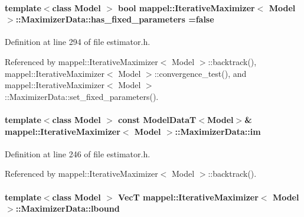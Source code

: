 \paragraph[{\texorpdfstring{has\+\_\+fixed\+\_\+parameters}{has_fixed_parameters}}]{\setlength{\rightskip}{0pt plus 5cm}template$<$class Model $>$ bool {\bf mappel\+::\+Iterative\+Maximizer}$<$ Model $>$\+::Maximizer\+Data\+::has\+\_\+fixed\+\_\+parameters =false}\hypertarget{classmappel_1_1IterativeMaximizer_1_1MaximizerData_a9f1c22b2c3065f92244230a74fc948aa}{}\label{classmappel_1_1IterativeMaximizer_1_1MaximizerData_a9f1c22b2c3065f92244230a74fc948aa}


Definition at line 294 of file estimator.\+h.



Referenced by mappel\+::\+Iterative\+Maximizer$<$ Model $>$\+::backtrack(), mappel\+::\+Iterative\+Maximizer$<$ Model $>$\+::convergence\+\_\+test(), and mappel\+::\+Iterative\+Maximizer$<$ Model $>$\+::\+Maximizer\+Data\+::set\+\_\+fixed\+\_\+parameters().

\paragraph[{\texorpdfstring{im}{im}}]{\setlength{\rightskip}{0pt plus 5cm}template$<$class Model $>$ const {\bf Model\+DataT}$<$Model$>$\& {\bf mappel\+::\+Iterative\+Maximizer}$<$ Model $>$\+::Maximizer\+Data\+::im}\hypertarget{classmappel_1_1IterativeMaximizer_1_1MaximizerData_afcee3fa283be1a9ba1d197ed777d447c}{}\label{classmappel_1_1IterativeMaximizer_1_1MaximizerData_afcee3fa283be1a9ba1d197ed777d447c}


Definition at line 246 of file estimator.\+h.



Referenced by mappel\+::\+Iterative\+Maximizer$<$ Model $>$\+::backtrack().

\paragraph[{\texorpdfstring{lbound}{lbound}}]{\setlength{\rightskip}{0pt plus 5cm}template$<$class Model $>$ {\bf VecT} {\bf mappel\+::\+Iterative\+Maximizer}$<$ Model $>$\+::Maximizer\+Data\+::lbound}\hypertarget{classmappel_1_1IterativeMaximizer_1_1MaximizerData_aead80fc0e12236ca355849ad36749094}{}\label{classmappel_1_1IterativeMaximizer_1_1MaximizerData_aead80fc0e12236ca355849ad36749094}



